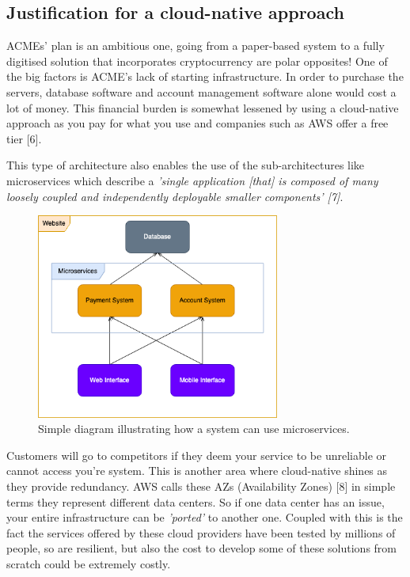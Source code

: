   \subsection{Justification for a cloud-native approach}
  ACMEs' plan is an ambitious one, going from a paper-based system to a fully digitised solution that incorporates cryptocurrency are polar opposites! One of 
  the big factors is ACME's lack of starting infrastructure. In order to purchase the servers, database software and account management software alone would
  cost a lot of money. This financial burden is somewhat lessened by using a cloud-native approach as you pay for what you use and companies such as AWS offer
  a free tier [6].
  
  This type of architecture also enables the use of the sub-architectures like microservices which describe a \textit{'single application [that] is 
  composed of many loosely coupled and independently deployable smaller components' [7]}.

  \begin{figure}[H]
    \centering
    \includegraphics[width=8cm]{assets/microservices.drawio.png}
    \caption{Simple diagram illustrating how a system can use microservices.}
    \label{fig:microservices}
  \end{figure}

  Customers will go to competitors if they deem your service to be unreliable or cannot access you're system. This is another area where cloud-native shines 
  as they provide redundancy. AWS calls these AZs (Availability Zones) [8] in simple terms they represent different data centers. So if one data center 
  has an issue, your entire infrastructure can be \textit{'ported'} to another one. Coupled with this is the fact the services offered by these cloud
  providers have been tested by millions of people, so are resilient, but also the cost to develop some of these solutions from scratch could be
  extremely costly.

